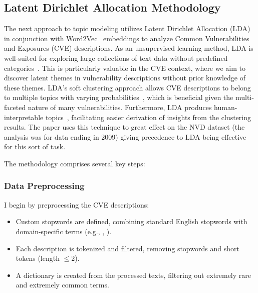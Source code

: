 \documentclass[12pt]{article}
\begin{document}
\subsection{Latent Dirichlet Allocation Methodology}

The next approach to topic modeling utilizes Latent Dirichlet Allocation (LDA)~\cite{lda_origin} in
conjunction with Word2Vec~\cite{word2vec} embeddings to analyze Common Vulnerabilities and Exposures
(CVE) descriptions. As an unsupervised learning method, LDA is well-suited for exploring large
collections of text data without predefined categories~\cite{lda_origin, latent_handbook}. This is
particularly valuable in the CVE context, where we aim to discover latent themes in vulnerability
descriptions without prior knowledge of these themes. LDA's soft clustering approach allows CVE
descriptions to belong to multiple topics with varying probabilities~\cite{latent_handbook}, which is beneficial given
the multi-faceted nature of many vulnerabilities. Furthermore, LDA produces human-interpretable
topics~\cite{lda_origin}, facilitating easier derivation of insights from the clustering results.
The paper \cite{cve_topic_modelling} uses this technique to great effect on the NVD
dataset (the analysis was for data ending in 2009) giving precedence to LDA being effective for this
sort of task.

The methodology comprises several key steps:

\subsubsection{Data Preprocessing} I begin by preprocessing the CVE descriptions:

\begin{itemize}

	\item Custom stopwords are defined, combining standard English stopwords with domain-specific
	      terms (e.g., , ).

	\item Each description is tokenized and filtered, removing stopwords and short tokens (length
	      $\leq 2$).

	\item A dictionary is created from the processed texts, filtering out extremely rare and
	      extremely common terms.

\end{itemize}
\end{document}
